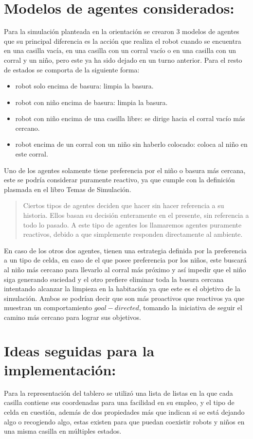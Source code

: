 \documentclass[titlepage,11pt]{scrartcl}
\begin{document}
\section{Modelos de agentes considerados:}
Para la simulación planteada en la orientación se crearon 3 modelos de agentes que su principal diferencia es la acción que realiza el robot cuando se encuentra en una casilla vacía, en una casilla con un corral vacío o en una casilla con un corral y un niño, pero este ya ha sido dejado en un turno anterior. Para el resto de estados se comporta de la siguiente forma:
\begin{itemize}
    \item robot solo encima de basura: limpia la basura.
    \item robot con niño encima de basura: limpia la basura.
    \item robot con niño encima de una casilla libre: se dirige hacia el corral vacío más cercano.
    \item robot encima de un corral con un niño sin haberlo colocado: coloca al niño en este corral.
\end{itemize}
Uno de los agentes solamente tiene preferencia por el niño o basura más cercana, este se podría considerar puramente reactivo, ya que cumple con la definición plasmada en el libro Temas de Simulación.
\begin{quotation}
    Ciertos tipos de agentes deciden que hacer sin hacer referencia a su historia. Ellos basan su decisión enteramente en el presente, sin referencia a todo lo pasado. A este tipo de agentes los llamaremos agentes puramente reactivos, debido a que simplemente responden directamente al ambiente.
\end{quotation}
En caso de los otros dos agentes, tienen una estrategia definida por la preferencia a un tipo de celda, en caso de el que posee preferencia por los niños, este buscará al niño más cercano para llevarlo al corral más próximo y así impedir que el niño siga generando suciedad y el otro prefiere eliminar toda la basura cercana intentando alcanzar la limpieza en la habitación ya que este es el objetivo de la simulación. Ambos se podrían decir que son más proactivos que reactivos ya que muestran un comportamiento $goal-directed$, tomando la iniciativa de seguir el camino más cercano para lograr sus objetivos.


\section{Ideas seguidas para la implementación:}
Para la representación del tablero se utilizó una lista de listas en la que cada casilla contiene sus coordenadas para una facilidad en su empleo, y el tipo de celda en cuestión, además de dos propiedades más que indican si se está dejando algo o recogiendo algo, estas existen para que puedan coexistir robots y niños en una misma casilla en múltiples estados.
\end{document}
